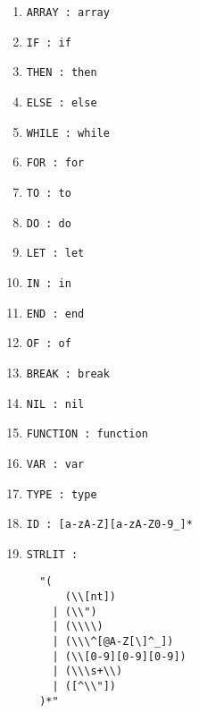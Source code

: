 \documentclass{article}
\begin{document}
\begin{enumerate}
  \item \verb|ARRAY : array|

  \item \verb|IF : if|

  \item \verb|THEN : then|

  \item \verb|ELSE : else|

  \item \verb|WHILE : while|

  \item \verb|FOR : for|

  \item \verb|TO : to|

  \item \verb|DO : do|

  \item \verb|LET : let|

  \item \verb|IN : in|

  \item \verb|END : end|

  \item \verb|OF : of|

  \item \verb|BREAK : break|

  \item \verb|NIL : nil|

  \item \verb|FUNCTION : function|

  \item \verb|VAR : var|

  \item \verb|TYPE : type|

  \item \verb|ID : [a-zA-Z][a-zA-Z0-9_]*|

  \item \verb|STRLIT :|
  \begin{verbatim}
  "(
      (\\[nt])
    | (\\")
    | (\\\\)
    | (\\\^[@A-Z[\]^_])
    | (\\[0-9][0-9][0-9])
    | (\\\s+\\)
    | ([^\\"])
  )*"
  \end{verbatim}


\end{enumerate}
\end{document}
